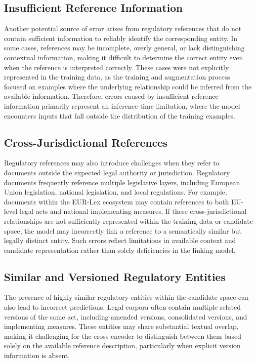 \subsection{Insufficient Reference Information}

Another potential source of error arises from regulatory references that do not contain sufficient information to reliably identify the corresponding entity. In some cases, references may be incomplete, overly general, or lack distinguishing contextual information, making it difficult to determine the correct entity even when the reference is interpreted correctly. These cases were not explicitly represented in the training data, as the training and augmentation process focused on examples where the underlying relationship could be inferred from the available information. Therefore, errors caused by insufficient reference information primarily represent an inference-time limitation, where the model encounters inputs that fall outside the distribution of the training examples.

\subsection{Cross-Jurisdictional References}

Regulatory references may also introduce challenges when they refer to documents outside the expected legal authority or jurisdiction. Regulatory documents frequently reference multiple legislative layers, including European Union legislation, national legislation, and local regulations. For example, documents within the EUR-Lex ecosystem may contain references to both EU-level legal acts and national implementing measures. If these cross-jurisdictional relationships are not sufficiently represented within the training data or candidate space, the model may incorrectly link a reference to a semantically similar but legally distinct entity. Such errors reflect limitations in available context and candidate representation rather than solely deficiencies in the linking model.

\subsection{Similar and Versioned Regulatory Entities}

The presence of highly similar regulatory entities within the candidate space can also lead to incorrect predictions. Legal corpora often contain multiple related versions of the same act, including amended versions, consolidated versions, and implementing measures. These entities may share substantial textual overlap, making it challenging for the cross-encoder to distinguish between them based solely on the available reference description, particularly when explicit version information is absent.

